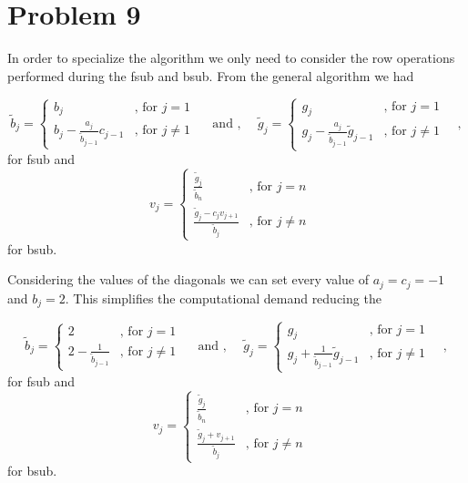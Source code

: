 \documentclass[final, 3p, times, 11.5pt]{article}
\begin{document}
\section*{Problem 9}


In order to specialize the algorithm we only need to consider the row operations performed during the fsub and bsub. From the general algorithm we had 

$$
\tilde{b}_j = 
\begin{cases} 
b_j \quad  & \text{, for } j=1 \\
b_j - \frac{a_j}{\tilde{b}_{j-1}}c_{j-1} & \text{, for } j\neq 1
\end{cases}
\quad \text{ and , } \quad
\tilde{g}_j = 
\begin{cases} 
g_j \quad  & \text{, for } j=1 \\
g_j - \frac{a_j}{\tilde{b}_{j-1}}\tilde{g}_{j-1} & \text{, for } j\neq 1
\end{cases} \quad , 
$$
for fsub and 
$$
v_j = 
\begin{cases} 
\frac{\tilde{g}_j}{\tilde{b}_n} \quad  & \text{, for } j=n \\
\frac{\tilde{g}_j - c_jv_{j+1}}{\tilde{b}_j} & \text{, for } j\neq n
\end{cases} \quad 
$$
for bsub. 

Considering the values of the diagonals we can set every value of $a_j=c_j=-1$ and $b_j = 2$. This simplifies the computational demand reducing the 

$$
\tilde{b}_j = 
\begin{cases} 
2 \quad  & \text{, for } j=1 \\
2 - \frac{1}{\tilde{b}_{j-1}} & \text{, for } j\neq 1
\end{cases}
\quad \text{ and , } \quad
\tilde{g}_j = 
\begin{cases} 
g_j \quad  & \text{, for } j=1 \\
g_j + \frac{1}{\tilde{b}_{j-1}}\tilde{g}_{j-1} & \text{, for } j\neq 1
\end{cases} \quad , 
$$
for fsub and 
$$
v_j = 
\begin{cases} 
\frac{\tilde{g}_j}{\tilde{b}_n} \quad  & \text{, for } j=n \\
\frac{\tilde{g}_j + v_{j+1}}{\tilde{b}_j} & \text{, for } j\neq n
\end{cases} \quad 
$$
for bsub. 
\end{document}

